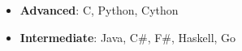 \begin{itemize}[leftmargin=0.15in, label={}, itemsep=0em]
	\item \textbf{Advanced}{: C, Python, Cython}
  \item \textbf{Intermediate}{: Java, C\#, F\#, Haskell, Go}
\end{itemize}
